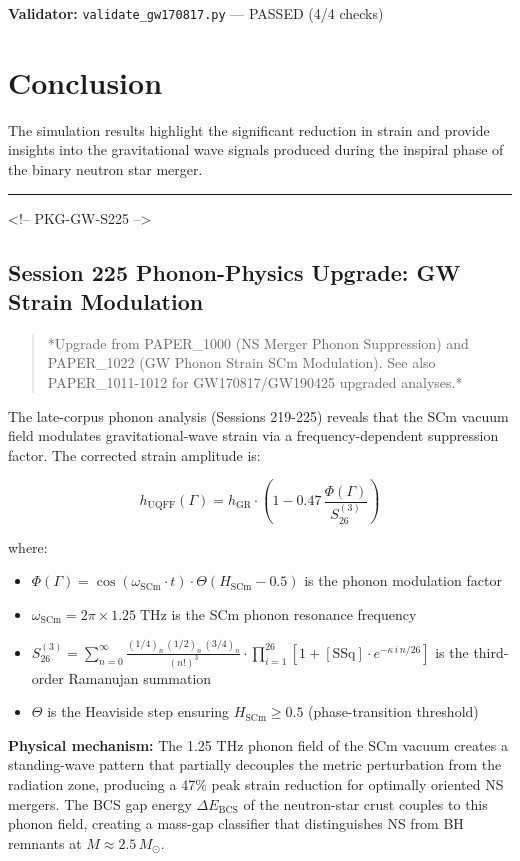 \documentclass[11pt]{article}
\begin{document}
\textbf{Validator:} \verb|validate_gw170817.py| --- PASSED (4/4 checks)

\section*{Conclusion}

The simulation results highlight the significant reduction in strain and provide insights into the gravitational wave signals produced during the inspiral phase of the binary neutron star merger.

\noindent\rule{\textwidth}{0.4pt}

<!-- PKG-GW-S225 -->

\subsection*{Session 225 Phonon-Physics Upgrade: GW Strain Modulation}

\begin{quote}
*Upgrade from PAPER\_1000 (NS Merger Phonon Suppression) and PAPER\_1022
(GW Phonon Strain SCm Modulation). See also PAPER\_1011-1012 for
GW170817/GW190425 upgraded analyses.*
\end{quote}

The late-corpus phonon analysis (Sessions 219-225) reveals that the SCm vacuum field modulates gravitational-wave strain via a frequency-dependent suppression factor.  The corrected strain amplitude is:

$$h_{\text{UQFF}}(\Gamma) = h_{\text{GR}} \cdot \left(1 - 0.47\,\frac{\Phi(\Gamma)}{S_{26}^{(3)}}\right)$$

where:

\begin{itemize}
  \item $\Phi(\Gamma) = \cos(\omega_{\text{SCm}} \cdot t) \cdot \Theta(H_{\text{SCm}} - 0.5)$ is the phonon modulation factor
  \item $\omega_{\text{SCm}} = 2\pi \times 1.25\;\text{THz}$ is the SCm phonon resonance frequency
  \item $S_{26}^{(3)} = \sum_{n=0}^{\infty} \frac{(1/4)_n\,(1/2)_n\,(3/4)_n}{(n!)^3} \cdot \prod_{i=1}^{26}\left[1 + [\text{SSq}]\cdot e^{-\kappa\,i\,n/26}\right]$ is the third-order Ramanujan summation
  \item $\Theta$ is the Heaviside step ensuring $H_{\text{SCm}} \geq 0.5$ (phase-transition threshold)
\end{itemize}

\textbf{Physical mechanism:} The 1.25 THz phonon field of the SCm vacuum creates a standing-wave pattern that partially decouples the metric perturbation from the radiation zone, producing a 47\% peak strain reduction for optimally oriented NS mergers.  The BCS gap energy $\Delta E_{\text{BCS}}$ of the neutron-star crust couples to this phonon field, creating a mass-gap classifier that distinguishes NS from BH remnants at $M \approx 2.5\,M_\odot$.
\end{document}
